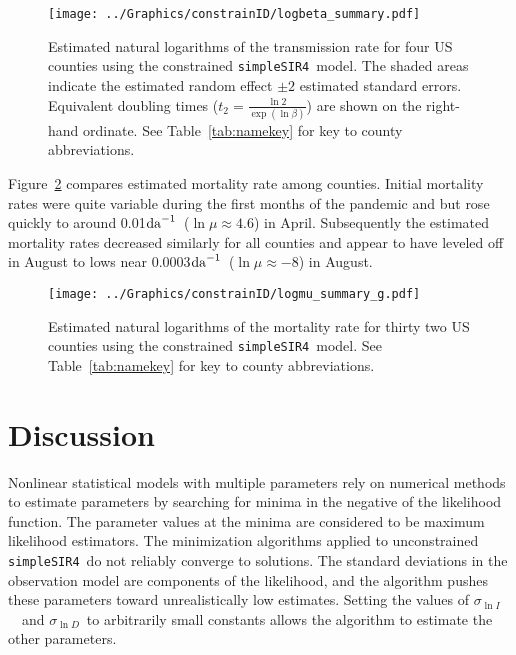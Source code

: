 \documentclass[12pt,letterpaper]{article}
\newcommand\perda{$\rm{da}^{-1}$}
\newcommand\SSm{{\tt simpleSIR4}}
\newcommand\slI{$\sigma_{\ln I}$\ }
\newcommand\slD{$\sigma_{\ln D}$}
\begin{document}
\begin{figure}[h!]
\begin{center}
\texttt{[image: ../Graphics/constrainID/logbeta\_summary.pdf]}\\
\end{center}
\caption{\label{fig:xrates2}
Estimated natural logarithms of the transmission rate for four US
counties using the constrained \SSm\ model.
The shaded areas indicate the estimated random effect $\pm 2$
estimated standard errors.
Equivalent doubling times ($t_2 = \frac{\ln 2}{\exp(\ln \beta)}$)
are shown on the right-hand ordinate.
See Table~\ref{tab:namekey} for key to county abbreviations.
}
\end{figure}

Figure~\ref{fig:drates} compares estimated mortality rate among
counties. Initial mortality rates were quite variable during the first
months of the pandemic and but rose quickly to around 
0.01\perda\ ($\ln \mu \approx 4.6$) in April. Subsequently the
estimated mortality rates decreased similarly for all counties and appear to
have leveled off in August to lows near
0.0003\perda\ ($\ln \mu \approx -8$) in August.

\begin{figure}
\begin{center}
\texttt{[image: ../Graphics/constrainID/logmu\_summary\_g.pdf]}\\
\end{center}
\caption{\label{fig:drates}
Estimated natural logarithms of the mortality rate for thirty two US
counties using the constrained \SSm\ model.
See Table~\ref{tab:namekey} for key to county abbreviations.
}
\end{figure}

\section*{Discussion}

Nonlinear statistical models with multiple parameters rely
on numerical methods to estimate parameters by searching for minima
in the negative of the likelihood
function. The parameter values at the minima are considered to be
maximum likelihood estimators.  The minimization algorithms applied to
unconstrained \SSm\ do not reliably converge to solutions. The
standard deviations in the observation model are components of the
likelihood, and the algorithm pushes these parameters toward
unrealistically low estimates.  Setting the values of
\slI\ and \slD\ to arbitrarily small constants allows the
algorithm to estimate the other parameters.
\end{document}
